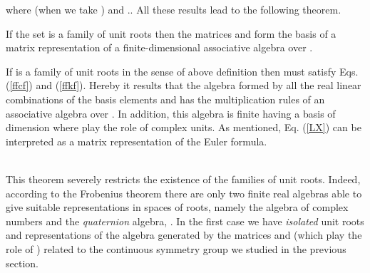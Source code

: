 \documentclass[a4paper,12pt]{article}
\begin{document}
where \coordHE{} (when we take \coordHE{}) and 
\coordHE{}.. All these results lead to the following theorem.
\begin{theor}
If the set \coordHE{} is a family of 
unit roots then the matrices \coordHE{} and \coordHE{} form the 
basis of a matrix representation of a finite-dimensional associative algebra 
over \coordHE{}.      
\end{theor}
\begin{demo}
If \coordHE{} is a family of unit roots in the sense of above definition then 
\coordHE{} must satisfy Eqs. (\ref{ffcf}) and (\ref{ffkf}). Hereby it results that 
the algebra formed by all the real linear combinations of the basis elements 
\coordHE{} and \coordHE{} has the multiplication rules of an associative 
algebra over \coordHE{} \cite{KANT}. In addition, this algebra is finite having 
a basis of dimension \coordHE{} where \coordHE{} play the role of complex 
units. As mentioned, Eq. (\ref{LX}) can be interpreted as a matrix 
representation of the Euler formula.
\end{demo}\\
This theorem severely restricts the  existence of the families of unit roots. 
Indeed, according to the Frobenius theorem there are only two finite real 
algebras able to give suitable representations in spaces of roots, namely the 
algebra \coordHE{} of complex numbers and the {\em quaternion} algebra, 
\coordHE{}. In the first case we have {\em isolated} unit roots \coordHE{}  and 
representations of the \coordHE{} algebra generated by the matrices \coordHE{} 
and \coordHE{} (which play the role of \coordHE{}) related to the 
continuous symmetry  group \coordHE{} we studied in the previous 
section. 
\end{document}
